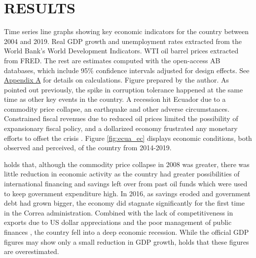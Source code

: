 \documentclass[floatsintext,man]{apa7}\usepackage[]{graphicx}\usepackage[]{color}
\begin{document}
\clearpage




\section{RESULTS}
\label{sec:findings}
Time series line graphs showing key economic indicators for the country between 2004 and 2019. Real GDP growth and unemployment rates extracted from the World Bank's World Development Indicators. WTI oil barrel prices extracted from FRED. The rest are estimates computed with the open-access AB databases, which include 95\% confidence intervals adjusted for design effects. See \hyperref[app:first]{Appendix A} for details on calculations. Figure prepared by the author. 
As pointed out previously, the spike in corruption tolerance happened at the same time as other key events in the country. A recession hit Ecuador due to a commodity price collapse, an earthquake and other adverse circumstances. Constrained fiscal revenues due to reduced oil prices limited the possibility of expansionary fiscal policy, and a dollarized economy frustrated any monetary efforts to offset the crisis \parencite{LaTorre.2017}. Figure \ref{fig:ecua_ec} displays economic conditions, both observed and perceived, of the country from 2014-2019.

\textcite{Orozco.2015} holds that, although the commodity price collapse in 2008 was greater, there was little reduction in economic activity as the country had greater possibilities of international financing and savings left over from past oil funds which were used to keep government expenditure high. In 2016, as savings eroded and government debt had grown bigger, the economy did stagnate significantly for the first time in the Correa administration. Combined with the lack of competitiveness in exports due to US dollar appreciations and the poor management of public finances \parencite{Hurtado.2018}, the country fell into a deep economic recession. While the official GDP figures may show only a small reduction in GDP growth, \textcite{Hurtado.2018} holds that these figures are overestimated.
\end{document}
